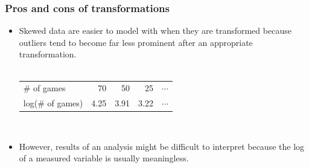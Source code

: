 \begin{frame}
\frametitle{Pros and cons of transformations}

\begin{itemize}

\item Skewed data are easier to model with when they are transformed because outliers tend to become far less prominent after an appropriate transformation. \\
$\:$ \\
\renewcommand{\arraystretch}{1.5}
\begin{tabular}{l r r r r }
\# of games		&  70 	& 50 		& 25 		 		& $\cdots$ \\
log(\# of games)	& 4.25	& 3.91 	& 3.22 	 	& $\cdots$
\end{tabular}

$\:$ \\

\item However, results of an analysis might be difficult to interpret because the log of a measured variable is usually meaningless.

\end{itemize}

\pause



\end{frame}


